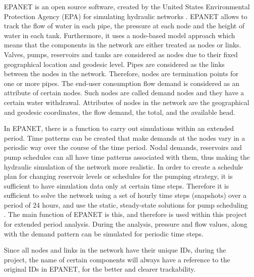 EPANET is an open source software, created by the United States Environmental Protection Agency (EPA) for simulating hydraulic networks \cite{agency2016epanet}. EPANET allows to track the flow of water in each pipe, the pressure at each node and the height of water in each tank. Furthermore, it uses a node-based model approach which means that the components in the network are either treated as nodes or links. Valves, pumps, reservoirs and tanks are considered as nodes due to their fixed geographical location and geodesic level. Pipes are considered as the links between the nodes in the network. Therefore, nodes are termination points for one or more pipes. The end-user consumption flow demand is considered as an attribute of certain nodes. Such nodes are called demand nodes and they have a certain water withdrawal. Attributes of nodes in the network are the geographical and geodesic coordinates, the flow demand, the total, and the available head. \cite{agency2016epanet}  

In EPANET, there is a function to carry out simulations within an extended period. Time patterns can be created that make demands at the nodes vary in a periodic way over the course of the time period. Nodal demands, reservoirs and pump schedules can all have time patterns associated with them, thus making the hydraulic simulation of the network more realistic. In order to create a schedule plan for changing reservoir levels or schedules for the pumping strategy, it is sufficient to have simulation data only at certain time steps. Therefore it is sufficient to solve the network using a set of hourly time steps (snapshots) over a period of 24 hours, and use the static, steady-state solutions for pump scheduling \cite{agency2016epanet}. The main function of EPANET is this, and therefore is used within this project for extended period analysis. During the analysis, pressure and flow values, along with the demand pattern can be simulated for periodic time steps. 

Since all nodes and links in the network have their unique IDs, during the project, the name of certain components will always have a reference to the original IDs in EPANET, for the better and clearer trackability. 









